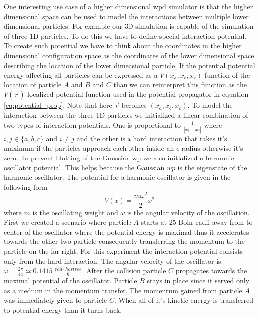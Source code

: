 One interesting use case of a higher dimensional \acrshort{wpd} simulator is that the higher dimensional space can be used to model the interactions between multiple lower dimensional particles.
For example our 3D simulation is capable of the simulation of three 1D particles.
To do this we have to define special interaction potential.
To create such potential we have to think about the coordinates in the higher dimensional configuration space as the coordinates of the lower dimensional space describing the location of the lower dimensional particle.
If the potential potential energy affecting all particles can be expressed as a $V(x_a, x_b, x_c)$ function of the location of particle $A$ and $B$ and $C$ than we can reinterpret this function as the $V(\vec{r})$ localized potential function used in the potential propagator in equation \ref{eq:potential_prop}.
Note that here $\vec{r}$ becomes $(x_a, x_b, x_c)$.
To model the interaction between the three 1D particles we initialized a linear combination of two types of interaction potentials.
One is proportional to $\frac{1}{|x_i - x_j|}$ where $i,j\in\{a,b,c\}$ and $i\neq j$ and the other is a hard interaction that takes it's maximum if the particles approach each other inside an $\epsilon$ radius otherwise it's zero.
To prevent blotting of the Gaussian \acrshort{wp} we also initialized a harmonic oscillator potential.
This helps because the Gaussian $wp$ is the eigenstate of the harmonic oscillator.
The potential for a harmonic oscillator is given in the following form
\begin{equation}
	\label{eq:harmonic_osc}
	V(x) = \frac{m\omega^2}{2}x^2
\end{equation}
where $m$ is the oscillating weight and $\omega$ is the angular velocity of the oscillation.
First we created a scenario where particle $A$ starts at $25$ Bohr radii away from to center of the oscillator where the potential energy is maximal thus it accelerates towards the other two particle consequently transferring the momentum to the particle on the far right.
For this experiment the interaction potential consists only from the hard interaction.
The angular velocity of the oscillator is $\omega = \frac{2\pi}{44} \simeq 0.1415\; \frac{rad\cdot hartree}{\hbar}$.
After the collision particle $C$ propagates towards the maximal potential of the oscillator.
Particle $B$ stays in place since it served only as a medium in the momentum transfer.
The momentum gained from particle $A$ was immediately given to particle $C$.
When all of it's kinetic energy is transferred to potential energy than it turns back.
